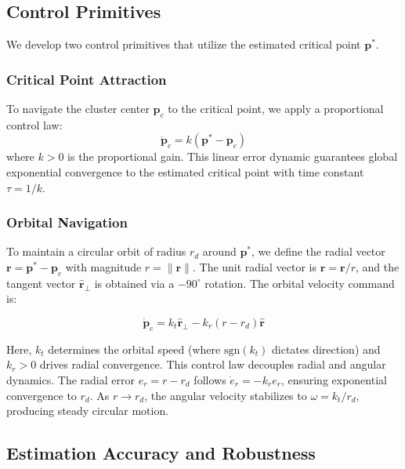 \documentclass[lettersize,journal]{IEEEtran}
\begin{document}
\subsection{Control Primitives}
\label{sec:control_primitives}

We develop two control primitives that utilize the estimated critical point $\mathbf{p}^*$.

\subsubsection{Critical Point Attraction}
To navigate the cluster center $\mathbf{p}_c$ to the critical point, we apply a proportional control law:
\begin{equation}
\dot{\mathbf{p}}_c = k(\mathbf{p}^* - \mathbf{p}_c)
\end{equation}
where $k > 0$ is the proportional gain. This linear error dynamic guarantees global exponential convergence to the estimated critical point with time constant $\tau = 1/k$.

\subsubsection{Orbital Navigation}
To maintain a circular orbit of radius $r_d$ around $\mathbf{p}^*$, we define the radial vector $\mathbf{r} = \mathbf{p}^* - \mathbf{p}_c$ with magnitude $r = \|\mathbf{r}\|$. The unit radial vector is $\hat{\mathbf{r}} = \mathbf{r}/r$, and the tangent vector $\hat{\mathbf{r}}_\perp$ is obtained via a $-90^\circ$ rotation. The orbital velocity command is:

\begin{equation}
\dot{\mathbf{p}}_c = k_t \hat{\mathbf{r}}_\perp - k_r(r - r_d)\hat{\mathbf{r}}
\end{equation}

Here, $k_t$ determines the orbital speed (where $\text{sgn}(k_t)$ dictates direction) and $k_r > 0$ drives radial convergence.
This control law decouples radial and angular dynamics. The radial error $e_r = r - r_d$ follows $\dot{e}_r = -k_r e_r$, ensuring exponential convergence to $r_d$. As $r \to r_d$, the angular velocity stabilizes to $\omega = k_t/r_d$, producing steady circular motion.

\subsection{Estimation Accuracy and Robustness}
\label{sec:estimation_accuracy}
\end{document}
